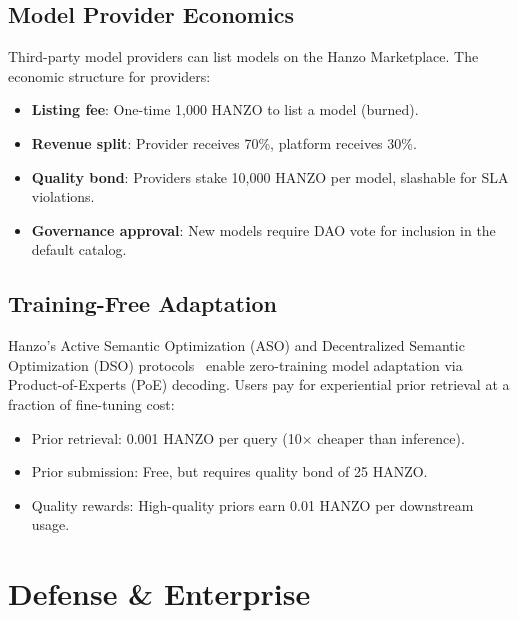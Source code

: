 \documentclass[11pt]{article}
\begin{document}
\subsection{Model Provider Economics}

Third-party model providers can list models on the Hanzo Marketplace. The
economic structure for providers:

\begin{itemize}[leftmargin=1.1em]
    \item \textbf{Listing fee}: One-time 1,000 HANZO to list a model (burned).
    \item \textbf{Revenue split}: Provider receives 70\%, platform receives 30\%.
    \item \textbf{Quality bond}: Providers stake 10,000 HANZO per model, slashable
    for SLA violations.
    \item \textbf{Governance approval}: New models require DAO vote for inclusion
    in the default catalog.
\end{itemize}

\subsection{Training-Free Adaptation}

Hanzo's Active Semantic Optimization (ASO) and Decentralized Semantic
Optimization (DSO) protocols~\cite{hanzoaso, hanzodso} enable zero-training model
adaptation via Product-of-Experts (PoE) decoding. Users pay for experiential
prior retrieval at a fraction of fine-tuning cost:

\begin{itemize}[leftmargin=1.1em]
    \item Prior retrieval: 0.001 HANZO per query (10$\times$ cheaper than
    inference).
    \item Prior submission: Free, but requires quality bond of 25 HANZO.
    \item Quality rewards: High-quality priors earn 0.01 HANZO per downstream
    usage.
\end{itemize}

\section{Defense \& Enterprise}
\label{sec:defense}
\end{document}
